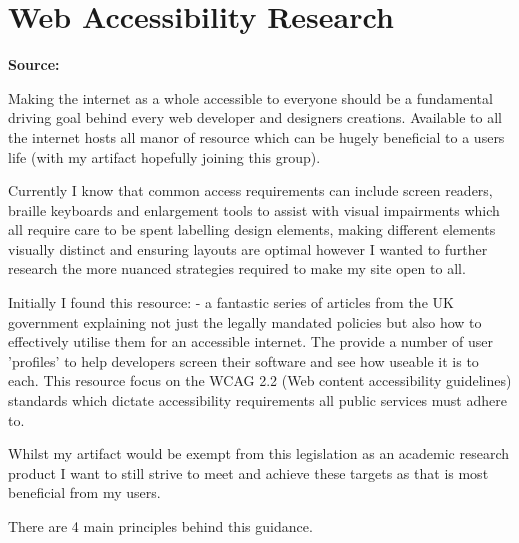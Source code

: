 \section{Web Accessibility Research}
\label{research:WebAccessibility}
\textbf{Source:} \cite{UnderstandingWCAG222024}

Making the internet as a whole accessible to everyone should be a fundamental driving goal behind every web developer and designers creations. Available to all the internet hosts all manor of resource which can be hugely beneficial to a users life (with my artifact hopefully joining this group). 

Currently I know that common access requirements can include screen readers, braille keyboards and enlargement tools to assist with visual impairments which all require care to be spent labelling design elements, making different elements visually distinct and ensuring layouts are optimal however I wanted to further research the more nuanced strategies required to make my site open to all.

Initially I found this resource: \cite{UnderstandingWCAG222024} - a fantastic series of articles from the UK government explaining not just the legally mandated policies but also how to effectively utilise them for an accessible internet. The provide a number of user 'profiles' to help developers screen their software and see how useable it is to each. This resource focus on the WCAG 2.2 (Web content accessibility guidelines) standards which dictate accessibility requirements all public services must adhere to.

Whilst my artifact would be exempt from this legislation as an academic research product I want to still strive to meet and achieve these targets as that is most beneficial from my users.

There are 4 main principles behind this guidance.

